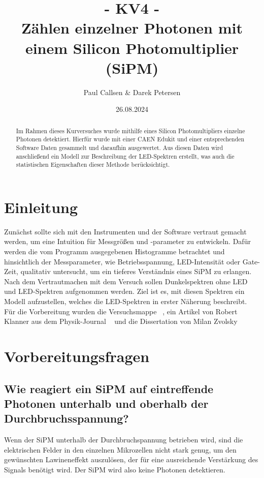 \documentclass[12pt]{article}
\title{- KV4 - \\ Zählen einzelner Photonen mit einem Silicon Photomultiplier (SiPM)}
\author{Paul Callsen \& Darek Petersen}
\date{26.08.2024}
\begin{document}
\maketitle
\thispagestyle{empty}
\clearpage

\begin{abstract}

Im Rahmen dieses Kurversuches wurde mithilfe eines Silicon Photomultipliers einzelne Photonen detektiert.
Hierfür wurde mit einer CAEN Edukit und einer entsprechenden Software Daten gesammelt und daraufhin ausgewertet.
Aus diesen Daten wird anschließend ein Modell zur Beschreibung der LED-Spektren erstellt, was auch die statistischen Eigenschaften dieser Methode berücksichtigt.
\end{abstract}

\section{Einleitung}
Zunächst sollte sich mit den Instrumenten und der Software vertraut gemacht werden, um eine Intuition für Messgrößen und -parameter zu entwickeln.
Dafür werden die vom Programm ausgegebenen Histogramme betrachtet und hinsichtlich der Messparameter, wie Betriebsspannung, LED-Intensität oder Gate-Zeit, qualitativ untersucht, um ein tieferes Verständnis eines SiPM zu erlangen.
Nach dem Vertrautmachen mit dem Versuch sollen Dunkelspektren ohne LED und LED-Spektren aufgenommen werden.
Ziel ist es, mit diesen Spektren ein Modell aufzustellen, welches die LED-Spektren in erster Näherung beschreibt.
Für die Vorbereitung wurden die Versuchsmappe ~\cite{Versuchsmappe}, ein Artikel von Robert Klanner aus dem Physik-Journal ~\cite{Klanner2019} und die Dissertation von Milan Zvolsky~\cite{Zvolsky2017}


\section{Vorbereitungsfragen}
\subsection{Wie reagiert ein SiPM auf eintreffende Photonen unterhalb und oberhalb der Durchbruchsspannung?}
Wenn der SiPM unterhalb der Durchbruchspannung betrieben wird, sind die elektrischen Felder in den einzelnen Mikrozellen nicht stark genug, um den gewünschten Lawineneffekt auszulösen, der für eine ausreichende Verstärkung des Signals benötigt wird.
Der SiPM wird also keine Photonen detektieren.
\end{document}
